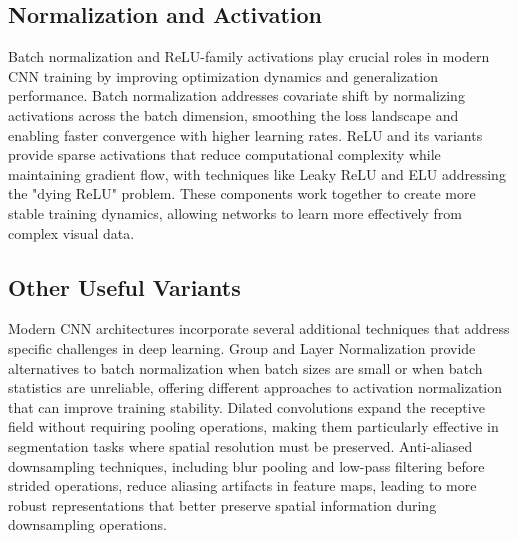 \subsection{Normalization and Activation}
Batch normalization and ReLU-family activations play crucial roles in modern CNN training by improving optimization dynamics and generalization performance. Batch normalization addresses covariate shift by normalizing activations across the batch dimension, smoothing the loss landscape and enabling faster convergence with higher learning rates. ReLU and its variants provide sparse activations that reduce computational complexity while maintaining gradient flow, with techniques like Leaky ReLU and ELU addressing the "dying ReLU" problem. These components work together to create more stable training dynamics, allowing networks to learn more effectively from complex visual data.\cite{Ioffe2015}

\subsection{Other Useful Variants}
Modern CNN architectures incorporate several additional techniques that address specific challenges in deep learning. Group and Layer Normalization provide alternatives to batch normalization when batch sizes are small or when batch statistics are unreliable, offering different approaches to activation normalization that can improve training stability. Dilated convolutions expand the receptive field without requiring pooling operations, making them particularly effective in segmentation tasks where spatial resolution must be preserved. Anti-aliased downsampling techniques, including blur pooling and low-pass filtering before strided operations, reduce aliasing artifacts in feature maps, leading to more robust representations that better preserve spatial information during downsampling operations.



